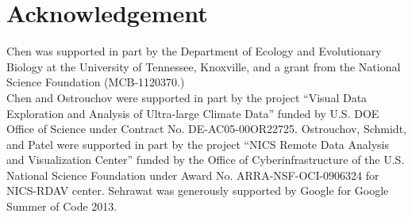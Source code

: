 \section*{Acknowledgement}

Chen was supported in part by
the Department of Ecology and Evolutionary Biology at the
University of Tennessee, Knoxville, and a grant from
the National Science Foundation (MCB-1120370.)
\\

Chen and Ostrouchov were supported in part by the project
``Visual Data Exploration and Analysis of Ultra-large Climate Data''
funded by U.S. DOE Office of Science
under Contract No. DE-AC05-00OR22725.
Ostrouchov, Schmidt, and Patel were supported in part by the project
``NICS Remote Data Analysis and Visualization Center''
funded by the Office of Cyberinfrastructure of the
U.S. National Science Foundation
under Award No. ARRA-NSF-OCI-0906324 for NICS-RDAV center. 
Sehrawat was generously supported by Google for Google Summer of Code 2013.
